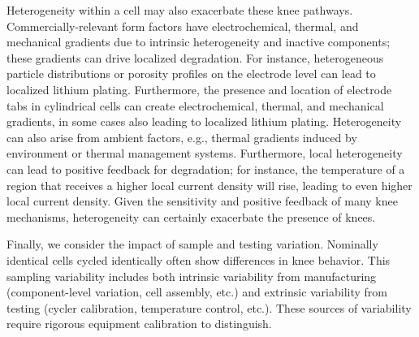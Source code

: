 \documentclass[journal=jpclcd,manuscript=article]{achemso}
\begin{document}
Heterogeneity within a cell may also exacerbate these knee pathways. Commercially-relevant form factors have electrochemical, thermal, and mechanical gradients due to intrinsic heterogeneity and inactive components; these gradients can drive localized degradation. For instance, heterogeneous particle distributions or porosity profiles on the electrode level can lead to localized lithium plating\cite{chung_particle_2014}. Furthermore, the presence and location of electrode tabs in cylindrical cells can create electrochemical, thermal, and mechanical gradients\cite{lee_three_2013, reimers_accurate_2014, senyshyn_homogeneity_2015, waldmann_influence_2015, waldmann_influence_2016, bach_nonlinear_2016, carter_detection_2019, yao_tab_2019, pfrang_geometrical_2019, li_optimal_2021}, in some cases also leading to localized lithium plating\cite{bach_nonlinear_2016, coron_impact_2020}{}. Heterogeneity can also arise from ambient factors, e.g., thermal gradients induced by environment or thermal management systems.\cite{werner_inhomogeneous_2020} Furthermore, local heterogeneity can lead to positive feedback for degradation; for instance, the temperature of a region that receives a higher local current density will rise, leading to even higher local current density. Given the sensitivity and positive feedback of many knee mechanisms, heterogeneity can certainly exacerbate the presence of knees.

Finally, we consider the impact of sample and testing variation. Nominally identical cells cycled identically often show differences in knee behavior. This sampling variability includes both intrinsic variability from manufacturing (component-level variation, cell assembly, etc.) and extrinsic variability from testing (cycler calibration, temperature control, etc.). These sources of variability require rigorous equipment calibration to distinguish.
\end{document}
